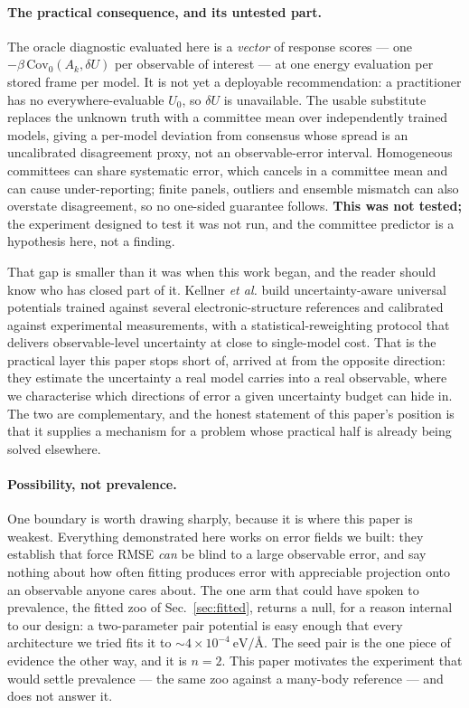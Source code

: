 \documentclass[aip,jcp,reprint,amsmath,amssymb,floatfix]{revtex4-2}
\newcommand{\dU}{\ensuremath{\delta U}}
\newcommand{\Cov}{\ensuremath{\mathrm{Cov}}}
\newcommand{\eVA}{\ensuremath{\mathrm{eV}/\text{\AA}}}
\begin{document}
\paragraph*{The practical consequence, and its untested part.} The oracle
diagnostic evaluated here is a \emph{vector} of response scores --- one
$-\beta\,\Cov_0(A_k,\dU)$ per observable of interest --- at one energy
evaluation per stored frame per model. It is not yet a deployable
recommendation: a practitioner has no everywhere-evaluable $U_0$, so $\dU$ is
unavailable.
The usable substitute replaces the unknown truth with a committee mean over
independently trained models\cite{Imbalzano2021}, giving a per-model deviation
from consensus whose spread is an uncalibrated disagreement proxy, not an
observable-error interval. Homogeneous committees can share systematic error,
which cancels in a committee mean and can cause under-reporting; finite panels,
outliers and ensemble mismatch can also overstate disagreement, so no one-sided
guarantee follows. \textbf{This was not tested;} the experiment designed to test
it was not run, and the committee predictor is a hypothesis here, not a finding.

That gap is smaller than it was when this work began, and the reader should know
who has closed part of it. Kellner \emph{et al.}\cite{Kellner2026} build
uncertainty-aware universal potentials trained against several
electronic-structure references and calibrated against experimental
measurements, with a statistical-reweighting protocol that delivers
observable-level uncertainty at close to single-model cost. That is the
practical layer this paper stops short of, arrived at from the opposite
direction: they estimate the uncertainty a real model carries into a real
observable, where we characterise which directions of error a given uncertainty
budget can hide in. The two are complementary, and the honest statement of this
paper's position is that it supplies a mechanism for a problem whose practical
half is already being solved elsewhere.

\paragraph*{Possibility, not prevalence.} One boundary is worth drawing sharply,
because it is where this paper is weakest. Everything demonstrated here works on
error fields we built: they establish that force RMSE \emph{can} be blind to a
large observable error, and say nothing about how often fitting produces error
with appreciable projection onto an observable anyone cares
about. The one arm that could have spoken to prevalence, the fitted zoo of
Sec.~\ref{sec:fitted}, returns a null, for a reason internal to our design: a
two-parameter pair potential is easy enough that every architecture we tried
fits it to $\sim 4\times10^{-4}~\eVA$. The seed pair is the one piece of
evidence the other way, and it is $n = 2$. This paper motivates the experiment
that would settle prevalence --- the same zoo against a many-body reference ---
and does not answer it.
\end{document}
